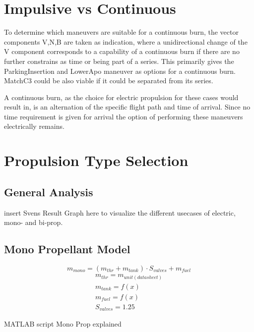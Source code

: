 \section{Impulsive vs Continuous}

To determine which maneuvers are suitable for a continuous burn, the vector components V,N,B are taken as indication, where a unidirectional change of the V component corresponds to a capability of a continuous burn if there are no further constrains as time or being part of a series. This primarily gives the ParkingInsertion and LowerApo maneuver as options for a continuous burn. MatchC3 could be also viable if it could be separated from its series.

A continuous burn, as the choice for electric propulsion for these cases would result in, is an alternation of the specific flight path and time of arrival. Since no time requirement is given for arrival the option of performing these maneuvers electrically remains.

\section{Propulsion Type Selection}
\subsection{General Analysis}
insert Svens Result Graph here to visualize the different usecases of electric, mono- and bi-prop.

\subsection{Mono Propellant Model}

\begin{equation}
    m_{mono} = ( m_{thr} + m_{tank}) \cdot S_{valves} + m_{fuel}
    \label{eq:mass-mono}
\end{equation}
\begin{equation*}
    \begin{array}{c}
    m_{thr} = m_{unit(datasheet)} \\
    m_{tank} =  f(x) \\
    m_{fuel} = f(x) \\
    S_{valves} = 1.25
    \end{array}
    \label{eq:mass-mono-items}
\end{equation*}

MATLAB script Mono Prop explained

